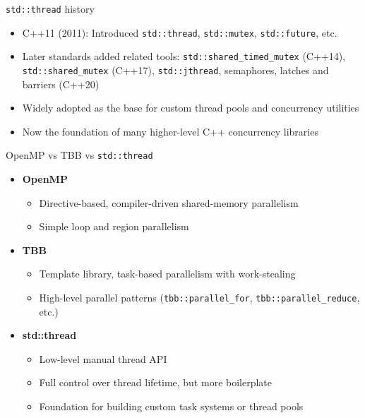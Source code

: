 \documentclass{beamer}
\begin{document}
\begin{frame}{\texttt{std::thread} history}
  \begin{itemize}
    \item C++11 (2011): Introduced \texttt{std::thread}, \texttt{std::mutex}, \texttt{std::future}, etc.
    \item Later standards added related tools: \texttt{std::shared\_timed\_mutex} (C++14),
      \texttt{std::shared\_mutex} (C++17), \texttt{std::jthread}, semaphores, latches and barriers (C++20)
    \item Widely adopted as the base for custom thread pools and concurrency utilities
    \item Now the foundation of many higher-level C++ concurrency libraries
  \end{itemize}
\end{frame}

\begin{frame}{OpenMP vs TBB vs \texttt{std::thread}}
  \begin{itemize}
    \item \textbf{OpenMP}
      \begin{itemize}
        \item Directive-based, compiler-driven shared-memory parallelism
        \item Simple loop and region parallelism
      \end{itemize}
    \item \textbf{TBB}
      \begin{itemize}
        \item Template library, task-based parallelism with work-stealing
        \item High-level parallel patterns (\texttt{tbb::parallel\_for}, \texttt{tbb::parallel\_reduce}, etc.)
      \end{itemize}
    \item \textbf{std::thread}
      \begin{itemize}
        \item Low-level manual thread API
        \item Full control over thread lifetime, but more boilerplate
        \item Foundation for building custom task systems or thread pools
      \end{itemize}
  \end{itemize}
\end{frame}
\end{document}
